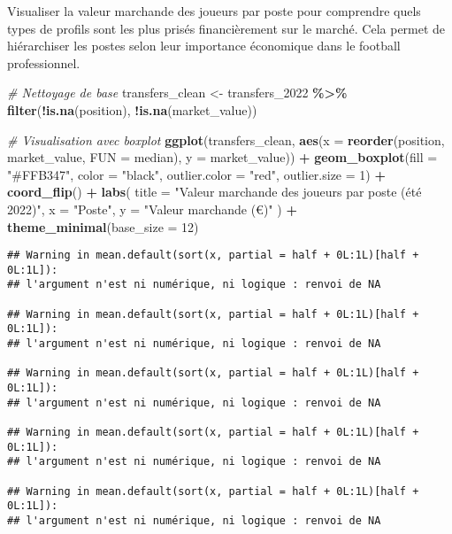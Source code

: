 \documentclass[
]{article}
\newenvironment{Shaded}{\begin{snugshade}}{\end{snugshade}}
\newcommand{\AttributeTok}[1]{\textcolor[rgb]{0.13,0.29,0.53}{#1}}
\newcommand{\CommentTok}[1]{\textcolor[rgb]{0.56,0.35,0.01}{\textit{#1}}}
\newcommand{\DecValTok}[1]{\textcolor[rgb]{0.00,0.00,0.81}{#1}}
\newcommand{\FunctionTok}[1]{\textcolor[rgb]{0.13,0.29,0.53}{\textbf{#1}}}
\newcommand{\NormalTok}[1]{#1}
\newcommand{\OtherTok}[1]{\textcolor[rgb]{0.56,0.35,0.01}{#1}}
\newcommand{\SpecialCharTok}[1]{\textcolor[rgb]{0.81,0.36,0.00}{\textbf{#1}}}
\newcommand{\StringTok}[1]{\textcolor[rgb]{0.31,0.60,0.02}{#1}}
\begin{document}
Visualiser la valeur marchande des joueurs par poste pour comprendre
quels types de profils sont les plus prisés financièrement sur le
marché. Cela permet de hiérarchiser les postes selon leur importance
économique dans le football professionnel.

\begin{Shaded}
\begin{Highlighting}[]
\CommentTok{\# Nettoyage de base}
\NormalTok{transfers\_clean }\OtherTok{\textless{}{-}}\NormalTok{ transfers\_2022 }\SpecialCharTok{\%\textgreater{}\%}
  \FunctionTok{filter}\NormalTok{(}\SpecialCharTok{!}\FunctionTok{is.na}\NormalTok{(position), }\SpecialCharTok{!}\FunctionTok{is.na}\NormalTok{(market\_value))}

\CommentTok{\# Visualisation avec boxplot}
\FunctionTok{ggplot}\NormalTok{(transfers\_clean, }\FunctionTok{aes}\NormalTok{(}\AttributeTok{x =} \FunctionTok{reorder}\NormalTok{(position, market\_value, }\AttributeTok{FUN =}\NormalTok{ median), }\AttributeTok{y =}\NormalTok{ market\_value)) }\SpecialCharTok{+}
  \FunctionTok{geom\_boxplot}\NormalTok{(}\AttributeTok{fill =} \StringTok{"\#FFB347"}\NormalTok{, }\AttributeTok{color =} \StringTok{"black"}\NormalTok{, }\AttributeTok{outlier.color =} \StringTok{"red"}\NormalTok{, }\AttributeTok{outlier.size =} \DecValTok{1}\NormalTok{) }\SpecialCharTok{+}
  \FunctionTok{coord\_flip}\NormalTok{() }\SpecialCharTok{+}
  \FunctionTok{labs}\NormalTok{(}
    \AttributeTok{title =} \StringTok{"Valeur marchande des joueurs par poste (été 2022)"}\NormalTok{,}
    \AttributeTok{x =} \StringTok{"Poste"}\NormalTok{,}
    \AttributeTok{y =} \StringTok{"Valeur marchande (€)"}
\NormalTok{  ) }\SpecialCharTok{+}
  \FunctionTok{theme\_minimal}\NormalTok{(}\AttributeTok{base\_size =} \DecValTok{12}\NormalTok{)}
\end{Highlighting}
\end{Shaded}

\begin{verbatim}
## Warning in mean.default(sort(x, partial = half + 0L:1L)[half + 0L:1L]):
## l'argument n'est ni numérique, ni logique : renvoi de NA

## Warning in mean.default(sort(x, partial = half + 0L:1L)[half + 0L:1L]):
## l'argument n'est ni numérique, ni logique : renvoi de NA

## Warning in mean.default(sort(x, partial = half + 0L:1L)[half + 0L:1L]):
## l'argument n'est ni numérique, ni logique : renvoi de NA

## Warning in mean.default(sort(x, partial = half + 0L:1L)[half + 0L:1L]):
## l'argument n'est ni numérique, ni logique : renvoi de NA

## Warning in mean.default(sort(x, partial = half + 0L:1L)[half + 0L:1L]):
## l'argument n'est ni numérique, ni logique : renvoi de NA
\end{verbatim}
\end{document}
